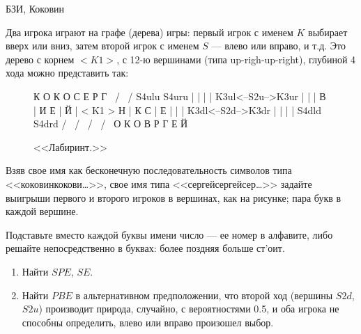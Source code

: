 \begin{problem}[<<Лабиринт>>.]
\begin{source}
БЗИ, Коковин
\end{source}  Два игрока играют на графе
(дерева) игры: первый игрок с именем $K$ выбирает вверх или
вниз, затем второй игрок с именем $S$ --- влево или вправо, и
т.д. Это дерево с корнем $<K1>$, с 12-ю вершинами (типа
up-righ-up-right), глубиной 4 хода можно представить так:

\begin{figure}[ht]
 К   О        К    О
 С   Е        Р    Г
  \  /         \  /
  S4ulu       S4uru
    |           |
    |           |
   K3ul<--S2u-->K3ur
    |     |     |
    В     |     И
    Е     |     Й
          |
        < K1 >
    Н     |     К
    С     |     Е
    |     |     |
   K3dl<--S2d-->K3dr
    |           |
    |           |
  S4dld        S4drd
  /  \         /  \
 /    \       /    \
О     К      О      В
Р     Г      Е      Й
\caption{<<Лабиринт.>>}
\end{figure}

Взяв свое имя как бесконечную последовательность символов
типа <<коковинкокови\ldots >>, свое имя типа
<<сергейсергейсер\ldots >> задайте выигрыши первого и второго
игроков в вершинах, как на рисунке; пара букв в каждой
вершине.

Подставьте вместо каждой буквы имени число --- ее номер в
алфавите, либо решайте непосредственно в буквах: более
поздняя больше ст'оит.

\begin{enumerate}

\item Найти $SPE$, $SE$.

\item Найти $PBE$ в альтернативном
предположении, что второй ход (вершины $S2d$, $S2u$)
производит природа, случайно, с вероятностями 0.5, и оба
игрока не способны определить, влево или вправо произошел
выбор.
\end{enumerate}





\begin{sol}

\end{sol}
\end{problem}





